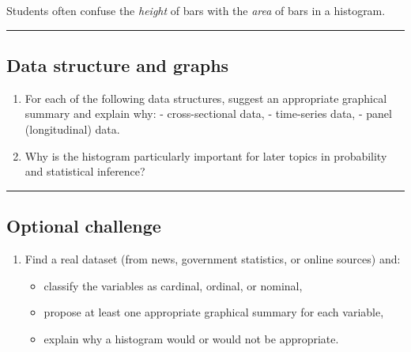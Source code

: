 \documentclass[
  letterpaper,
  DIV=11,
  numbers=noendperiod]{scrreprt}
\providecommand{\tightlist}{%
  \setlength{\itemsep}{0pt}\setlength{\parskip}{0pt}}
\begin{document}
\begin{tcolorbox}[enhanced jigsaw, coltitle=black, colbacktitle=quarto-callout-warning-color!10!white, left=2mm, bottomrule=.15mm, bottomtitle=1mm, colback=white, titlerule=0mm, colframe=quarto-callout-warning-color-frame, breakable, leftrule=.75mm, toptitle=1mm, opacitybacktitle=0.6, rightrule=.15mm, title=\textcolor{quarto-callout-warning-color}{\faExclamationTriangle}\hspace{0.5em}{Common pitfall}, arc=.35mm, opacityback=0, toprule=.15mm]

Students often confuse the \emph{height} of bars with the \emph{area} of
bars in a histogram.

\end{tcolorbox}

\begin{center}\rule{0.5\linewidth}{0.5pt}\end{center}

\subsection{Data structure and graphs}\label{data-structure-and-graphs}

\begin{enumerate}
\def\labelenumi{\arabic{enumi}.}
\setcounter{enumi}{10}
\tightlist
\item
  For each of the following data structures, suggest an appropriate
  graphical summary and explain why: - cross-sectional data, -
  time-series data, - panel (longitudinal) data.
\item
  Why is the histogram particularly important for later topics in
  probability and statistical inference?
\end{enumerate}

\begin{center}\rule{0.5\linewidth}{0.5pt}\end{center}

\subsection{Optional challenge}\label{optional-challenge}

\begin{enumerate}
\def\labelenumi{\arabic{enumi}.}
\setcounter{enumi}{12}
\tightlist
\item
  Find a real dataset (from news, government statistics, or online
  sources) and:

  \begin{itemize}
  \tightlist
  \item
    classify the variables as cardinal, ordinal, or nominal,
  \item
    propose at least one appropriate graphical summary for each
    variable,
  \item
    explain why a histogram would or would not be appropriate.
  \end{itemize}
\end{enumerate}
\end{document}
